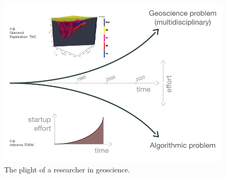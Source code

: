 \begin{figure}
    \begin{center}
    \includegraphics[width=0.8\columnwidth]{figures/diverging_curves-01.png}
    \end{center}
\caption{
    The plight of a researcher in geoscience.
}
\label{fig:diverging-curves}
\end{figure}
